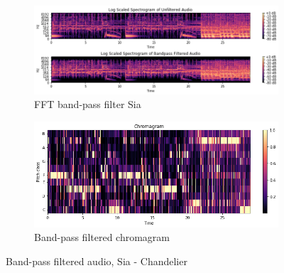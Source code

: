 \begin{figure}[htbp]
{{			\begin{subfigure}{.495\textwidth}
				\centering
				\includegraphics[scale=0.3]{Images/Chroma/siafft.png}
				\caption{FFT band-pass filter Sia}
				\label{siafft}
			\end{subfigure}%
			\begin{subfigure}{.495\textwidth}
				\centering
				\includegraphics[scale=0.3]{Images/Chroma/chroma_bp.png}
				\caption{Band-pass filtered chromagram}
				\label{pvfft}
			\end{subfigure}%
	}}
	\caption{Band-pass filtered audio, Sia - Chandelier}
	\label{fig:sia2}
\end{figure}

